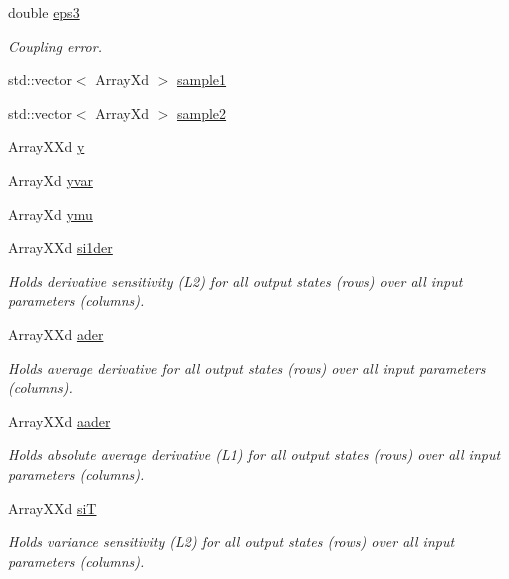 \begin{DoxyCompactItemize}
double \hyperlink{class_go_s_u_m_1_1_c_sensitivity_analysis_a22561f312eacc952b940c5a551bd9fe1}{eps3}
\begin{DoxyCompactList}\small\item\em Coupling error. \end{DoxyCompactList}\item 
std\-::vector$<$ Array\-Xd $>$ \hyperlink{class_go_s_u_m_1_1_c_sensitivity_analysis_a4d7c3c0c2f9ff497a3572e3076eab4cd}{sample1}
\item 
std\-::vector$<$ Array\-Xd $>$ \hyperlink{class_go_s_u_m_1_1_c_sensitivity_analysis_a83eb17d32027d8784cbb15016a0959ea}{sample2}
\item 
Array\-X\-Xd \hyperlink{class_go_s_u_m_1_1_c_sensitivity_analysis_a171637b92e5aea9ed4ef91b6d9a071fc}{y}
\item 
Array\-Xd \hyperlink{class_go_s_u_m_1_1_c_sensitivity_analysis_a6312834689d3d295a7819352140dcc72}{yvar}
\item 
Array\-Xd \hyperlink{class_go_s_u_m_1_1_c_sensitivity_analysis_a51c232e563e72f692ca0888aa70a1b16}{ymu}
\item 
Array\-X\-Xd \hyperlink{class_go_s_u_m_1_1_c_sensitivity_analysis_a6f187832e5572a283ab5cf99000f55e3}{si1der}
\begin{DoxyCompactList}\small\item\em Holds derivative sensitivity (L2) for all output states (rows) over all input parameters (columns). \end{DoxyCompactList}\item 
Array\-X\-Xd \hyperlink{class_go_s_u_m_1_1_c_sensitivity_analysis_a242251c1a3100d2f27901211c5ed4383}{ader}
\begin{DoxyCompactList}\small\item\em Holds average derivative for all output states (rows) over all input parameters (columns). \end{DoxyCompactList}\item 
Array\-X\-Xd \hyperlink{class_go_s_u_m_1_1_c_sensitivity_analysis_af54ec9ad8cf33e25585bc6cc0df05e4a}{aader}
\begin{DoxyCompactList}\small\item\em Holds absolute average derivative (L1) for all output states (rows) over all input parameters (columns). \end{DoxyCompactList}\item 
Array\-X\-Xd \hyperlink{class_go_s_u_m_1_1_c_sensitivity_analysis_ab1c5393c009a6a16101da4062e8c9467}{si\-T}
\begin{DoxyCompactList}\small\item\em Holds variance sensitivity (L2) for all output states (rows) over all input parameters (columns). \end{DoxyCompactList}\item 

\end{DoxyCompactItemize}
